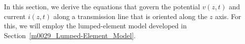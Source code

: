 

\label{m0079_Telegraphers_Equations} %

In this section, we derive the equations that govern the potential $v(z,t)$ and current $i(z,t)$ along a transmission line that is oriented along the $z$ axis.  
For this, we will employ the lumped-element model developed in Section~\ref{m0029_Lumped-Element_Model}.

